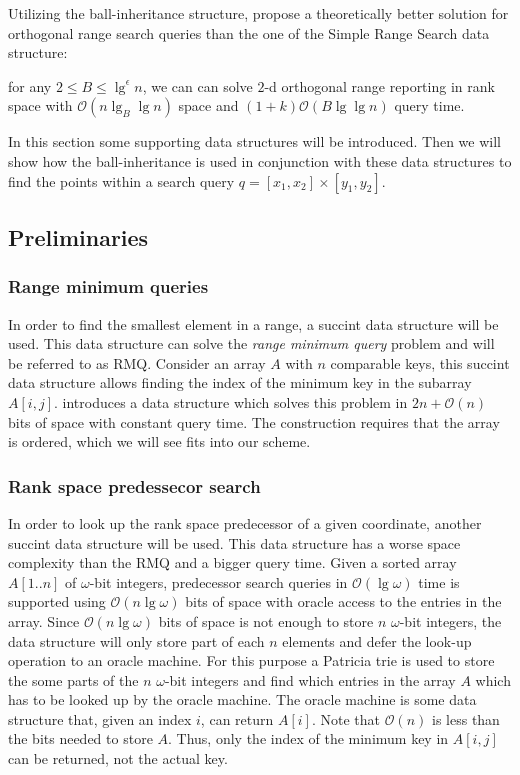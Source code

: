 Utilizing the ball-inheritance structure, \citet{chanetal} propose a theoretically better solution for orthogonal range search queries than the one of the Simple Range Search data structure: 
\begin{customthm}{2.1}\label{theorem21}
for any $2 \leq B \leq \lg^\epsilon n$, we can can solve $2$-d orthogonal range reporting in rank space with $\mathcal{O}(n \lg_B \lg n)$ space and $(1+k)\mathcal{O}(B \lg \lg n)$ query time.
\end{customthm}

In this section some supporting data structures will be introduced. Then we will show how the ball-inheritance is used in conjunction with these data structures to find the points within a search query $q = [x_1, x_2] \times [y_1, y_2]$.

\subsection{Preliminaries}

\subsubsection{Range minimum queries}
In order to find the smallest element in a range, a succint data structure will be used. This data structure can solve the \emph{range minimum query} problem and will be referred to as RMQ. 
Consider an array $A$ with $n$ comparable keys, this succint data structure allows finding the index of the minimum key in the subarray $A[i,j]$. \citet{fischer} introduces a data structure which solves this problem in $2n + \mathcal{O}(n)$ bits of space with constant query time. The construction requires that the array is ordered, which we will see fits into our scheme.

\subsubsection{Rank space predessecor search}
In order to look up the rank space predecessor of a given coordinate, another succint data structure will be used. This data structure has a worse space complexity than the RMQ and a bigger query time.
Given a sorted array $A[1..n]$ of $\omega$-bit integers, predecessor search queries in $\mathcal{O}(\lg \omega)$ time is supported using $\mathcal{O}(n \lg \omega)$ bits of space with oracle access to the entries in the array. Since $\mathcal{O}(n \lg \omega)$ bits of space is not enough to store $n$ $\omega$-bit integers, the data structure will only store part of each $n$ elements and defer the look-up operation to an oracle machine. For this purpose a Patricia trie \cite{morehaste} is used to store the some parts of the $n$ $\omega$-bit integers and find which entries in the array $A$ which has to be looked up by the oracle machine. The oracle machine is some data structure that, given an index $i$, can return $A[i]$. Note that $\mathcal{O}(n)$ is less than the bits needed to store $A$. Thus, only the index of the minimum key in $A[i,j]$ can be returned, not the actual key.

